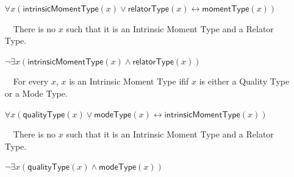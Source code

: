 \documentclass{article}
\newcommand{\AxLabel}{a}
\newcounter{cntax}
\newcommand{\myax}[1]{\refstepcounter{cntax}{\bf \small \AxLabel\thecntax}\label{#1}$\,\,\,\,$}
\newcommand{\me}[1]{\textsf{#1}}
\begin{document}
\begin{itemize}
    $\forall x(\textsf{intrinsicMomentType}(x)\vee \textsf{relatorType}(x)\leftrightarrow \textsf{momentType}(x))$
    
    
    
    
    \item[\myax{ax_momentType_partition}] There is no $x$ such that it is an \me{Intrinsic Moment Type} and a \me{Relator Type}.
    
    $\neg \exists x(\textsf{intrinsicMomentType}(x)\wedge \textsf{relatorType}(x))$
    
    

    \item[\myax{ax_intrinsicMomentType_taxonomy}] For every $x$, $x$ is an \me{Intrinsic Moment Type} ifif $x$ is either a \me{Quality Type} or a \me{Mode Type}.
    
    $\forall x(\textsf{qualityType}(x)\vee \textsf{modeType}(x)\leftrightarrow \textsf{intrinsicMomentType}(x))$
    
    
    
    
    \item[\myax{ax_intrinsicMomentType_partition}] There is no $x$ such that it is an \me{Intrinsic Moment Type} and a \me{Relator Type}.
    
    $\neg \exists x(\textsf{qualityType}(x)\wedge \textsf{modeType}(x))$
    
    
\end{itemize}







\end{document}
